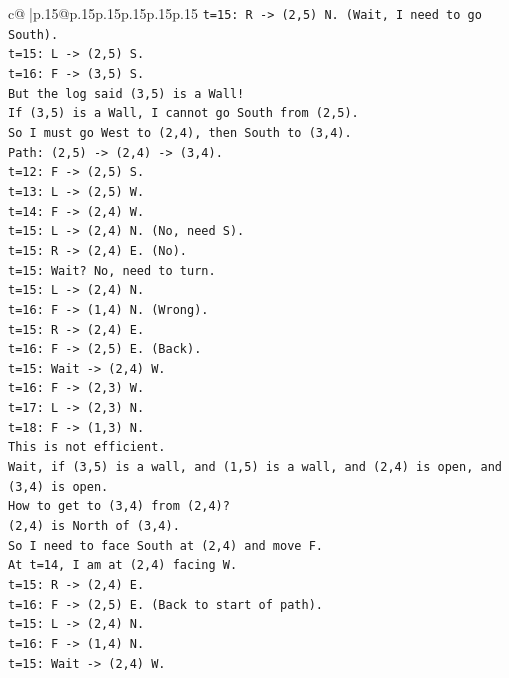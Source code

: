 \documentclass{article}
\begin{document}
{\begin{supertabular}{c@{$\;$}|p{.15\linewidth}@{}p{.15\linewidth}p{.15\linewidth}p{.15\linewidth}p{.15\linewidth}p{.15\linewidth}}
{{{\texttt{t=15: R {-}> (2,5) N. (Wait, I need to go South).} \\
\texttt{t=15: L {-}> (2,5) S.} \\
\texttt{t=16: F {-}> (3,5) S.} \\
\texttt{But the log said (3,5) is a Wall!} \\
\texttt{If (3,5) is a Wall, I cannot go South from (2,5).} \\
\texttt{So I must go West to (2,4), then South to (3,4).} \\
\texttt{Path: (2,5) {-}> (2,4) {-}> (3,4).} \\
\texttt{t=12: F {-}> (2,5) S.} \\
\texttt{t=13: L {-}> (2,5) W.} \\
\texttt{t=14: F {-}> (2,4) W.} \\
\texttt{t=15: L {-}> (2,4) N. (No, need S).} \\
\texttt{t=15: R {-}> (2,4) E. (No).} \\
\texttt{t=15: Wait? No, need to turn.} \\
\texttt{t=15: L {-}> (2,4) N.} \\
\texttt{t=16: F {-}> (1,4) N. (Wrong).} \\
\texttt{t=15: R {-}> (2,4) E.} \\
\texttt{t=16: F {-}> (2,5) E. (Back).} \\
\texttt{t=15: Wait {-}> (2,4) W.} \\
\texttt{t=16: F {-}> (2,3) W.} \\
\texttt{t=17: L {-}> (2,3) N.} \\
\texttt{t=18: F {-}> (1,3) N.} \\
\texttt{This is not efficient.} \\
\texttt{Wait, if (3,5) is a wall, and (1,5) is a wall, and (2,4) is open, and (3,4) is open.} \\
\texttt{How to get to (3,4) from (2,4)?} \\
\texttt{(2,4) is North of (3,4).} \\
\texttt{So I need to face South at (2,4) and move F.} \\
\texttt{At t=14, I am at (2,4) facing W.} \\
\texttt{t=15: R {-}> (2,4) E.} \\
\texttt{t=16: F {-}> (2,5) E. (Back to start of path).} \\
\texttt{t=15: L {-}> (2,4) N.} \\
\texttt{t=16: F {-}> (1,4) N.} \\
\texttt{t=15: Wait {-}> (2,4) W.} \\
}}}
\end{supertabular}}
\end{document}

